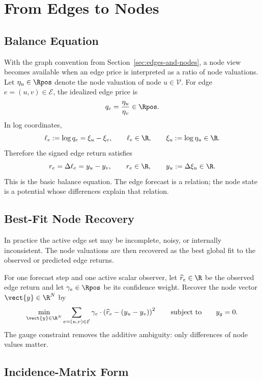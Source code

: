 \section{From Edges to Nodes}
\label{sec:edges-to-nodes}

\subsection{Balance Equation}
\label{subsec:balance-equation}

With the graph convention from Section~\ref{sec:edges-and-nodes}, a node view
becomes available when an edge price is interpreted as a ratio of node
valuations.  Let $\eta_u \in \Rpos$ denote the node valuation of node
$u \in \mathcal{V}$.  For edge $e=(u,v) \in \mathcal{E}$, the idealized edge
price is
\[
  q_e = \frac{\eta_u}{\eta_v}
  \in \Rpos.
\]
In log coordinates,
\[
  \ell_e := \log q_e = \xi_u - \xi_v,
  \qquad
  \ell_e \in \R,
  \qquad
  \xi_u := \log \eta_u \in \R.
\]
Therefore the signed edge return satisfies
\[
  r_e = \Delta \ell_e = y_u - y_v,
  \qquad
  r_e \in \R,
  \qquad
  y_u := \Delta \xi_u \in \R.
\]
This is the basic balance equation.  The edge forecast is a relation; the node
state is a potential whose differences explain that relation.

\subsection{Best-Fit Node Recovery}
\label{subsec:best-fit-node-recovery}

In practice the active edge set may be incomplete, noisy, or internally
inconsistent.  The node valuations are then recovered as the best global fit to the
observed or predicted edge returns.

For one forecast step and one active scalar observer, let
$\widehat{r}_e \in \R$ be the observed edge return and let
$\gamma_e \in \Rpos$ be its confidence weight.  Recover the node vector
$\vect{y} \in \R^N$ by
\[
  \min_{\vect{y} \in \R^N}
  \sum_{e=(u,v) \in \mathcal{E}}
  \gamma_e\cdot\left(\widehat{r}_e - (y_u - y_v)\right)^2
  \qquad\text{subject to}\qquad
  y_g = 0.
\]
The gauge constraint removes the additive ambiguity: only differences of node
values matter.

\subsection{Incidence-Matrix Form}
\label{subsec:incidence-matrix-form}

